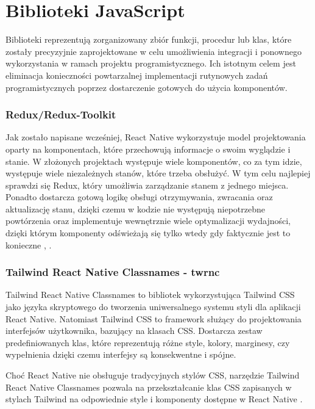 \section*{Biblioteki JavaScript}
Biblioteki reprezentują zorganizowany zbiór funkcji, procedur lub klas, które zostały
precyzyjnie zaprojektowane w celu umożliwienia integracji i ponownego wykorzystania
w ramach projektu programistycznego. Ich istotnym celem jest eliminacja konieczności
powtarzalnej implementacji rutynowych zadań programistycznych poprzez dostarczenie
gotowych do użycia komponentów.

\subsubsection*{\textbf{Redux/Redux-Toolkit}}
Jak zostało napisane wcześniej, React Native wykorzystuje model projektowania oparty
na komponentach, które przechowują informacje o swoim wyglądzie i stanie. W złożonych
projektach występuje wiele komponentów, co za tym idzie, występuje wiele niezależnych
stanów, które trzeba obsłużyć. W tym celu najlepiej sprawdzi się Redux, który umożliwia
zarządzanie stanem z jednego miejsca. Ponadto dostarcza gotową logikę obsługi
otrzymywania, zwracania oraz aktualizację stanu, dzięki czemu w kodzie nie występują
niepotrzebne powtórzenia oraz implementuje wewnętrznie wiele optymalizacji wydajności,
dzięki którym komponenty odświeżają się tylko wtedy gdy faktycznie jest to konieczne \cite{learningredux}, \cite{reactredux}.

\subsubsection*{\textbf{Tailwind React Native Classnames - twrnc}}
Tailwind React Native Classnames to bibliotek wykorzystująca Tailwind CSS jako języka skryptowego do tworzenia uniwersalnego systemu styli dla aplikacji React Native.
Natomiast Tailwind CSS to framework służący do projektowania interfejsów użytkownika, bazujący na klasach CSS.
Dostarcza zestaw predefiniowanych klas, które reprezentują różne style, kolory, marginesy, czy wypełnienia dzięki czemu interfejsy są konsekwentne i spójne.

Choć React Native nie obsługuje tradycyjnych stylów CSS, narzędzie Tailwind React
Native Classnames pozwala na przekształcanie klas CSS zapisanych w stylach Tailwind na
odpowiednie style i komponenty dostępne w React Native \cite{nativewind}.

